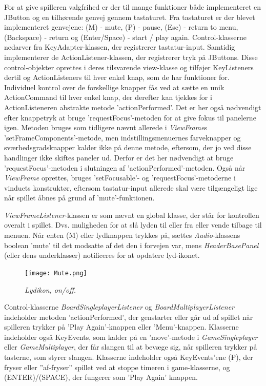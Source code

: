 For at give spilleren valgfrihed er der til mange funktioner både implementeret en JButton og en tilhørende genvej gennem tastaturet. Fra tastaturet er der blevet implementeret genvejene: (M) - mute, (P) - pause, (Esc) - return to menu, (Backspace) - return og (Enter/Space) - start / play again. Control-klasserne nedarver fra KeyAdapter-klassen, der registrerer tastatur-input. Samtidig implementerer de ActionListener-klassen, der registrerer tryk på JButtons. Disse control-objekter oprettes i deres tilsvarende view-klasse og tilføjer KeyListeners dertil og ActionListeners til hver enkel knap, som de har funktioner for. Individuel kontrol over de forskellige knapper fås ved at sætte en unik ActionCommand til hver enkel knap, der derefter kan tjekkes for i ActionListeneren abstrakte metode 'actionPerformed'. Det er her også nødvendigt efter knappetryk at bruge 'requestFocus'-metoden for at give fokus til panelerne igen. Metoden bruges som tidligere nævnt allerede i \textit{ViewFrame}s 'setFrameComponents'-metode, men indstillingsmenuernes farveknapper og sværhedsgradsknapper kalder ikke på denne metode, eftersom, der jo ved disse handlinger ikke skiftes paneler ud. Derfor er det her nødvendigt at bruge 'requestFocus'-metoden i slutningen af 'actionPerformed'-metoden.
Også når \textit{ViewFrame} oprettes, bruges 'setFocusable'- og 'requestFocus'-metoderne i vinduets konstruktør, eftersom tastatur-input allerede skal være tilgængeligt lige når spillet åbnes på grund af 'mute'-funktionen.
\newline

\textit{ViewFrameListener}-klassen er som nævnt en global klasse, der står for kontrollen overalt i spillet. Dvs. muligheden for at slå lyden til eller fra eller vende tilbage til menuen. Når enten (M) eller lydknappen trykkes på, sættes \textit{Audio}-klassens boolean 'mute' til det modsatte af det den i forvejen var, mens \textit{HeaderBasePanel} (eller dens underklasser) notificeres for at opdatere lyd-ikonet.

\begin{figure}[h]
	\centering
   	\texttt{[image: Mute.png]}
	\caption{\textit{Lydikon, on/off.}}
\end{figure}

Control-klasserne \textit{BoardSingleplayerListener} og \textit{BoardMultiplayerListener} indeholder metoden 'actionPerformed', der genstarter eller går ud af spillet når spilleren trykker på 'Play Again'-knappen eller 'Menu'-knappen. Klasserne indeholder også KeyEvents, som kalder på en 'move'-metode i \textit{GameSingleplayer} eller \textit{GameMultiplayer}, der får slangen til at bevæge sig, når spilleren trykker på tasterne, som styrer slangen. Klasserne indeholder også KeyEvents'ene (P), der fryser eller ''af-fryser'' spillet ved at stoppe timeren i game-klasserne, og (ENTER)/(SPACE), der fungerer som 'Play Again' knappen.
\newline

